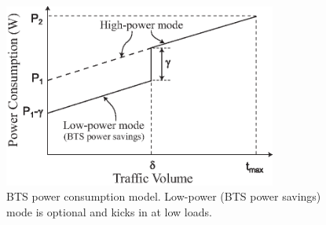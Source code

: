 \begin{figure}
\centering
\includegraphics[width=0.8\textwidth]{pics/powermodel.eps}
\caption{BTS power consumption model. Low-power (BTS power savings) mode is optional and kicks in at low loads.}
\label{fig:powermodel}
\end{figure}

